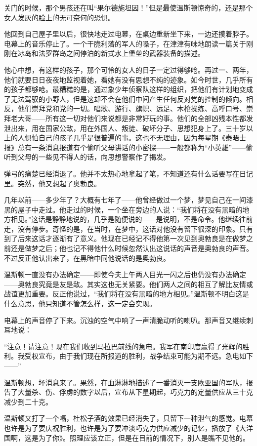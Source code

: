 关门的时候，那个男孩还在叫“果尔德施坦因！”但是最使温斯顿惊奇的，还是那个女人发灰的脸上的无可奈何的恐惧。


他回到自己屋子里以后，很快地走过电幕，在桌边重新坐下来，一边还摸着脖子。电幕上的音乐停止了。一个干脆利落的军人的嗓子，在津津有味地朗读一篇关于刚刚在冰岛和法罗群岛之间停泊的新式水上堡垒的武器装备的描述。


他心中想，有这样的孩子，那个可怜的女人的日子一定过得够呛。再过一、两年，他们就要日日夜夜地监视着她，看她有没有思想不纯的迹象。如今时世，几乎所有的孩子都够呛。最糟糕的是，通过象少年侦察队这样的组织，把他们有计划地变成了无法驾驭的小野人，但是这却不会在他们中间产生任何反对党的控制的倾向。相反，他们崇拜党和党的一切。唱歌、游行、旗帜、远足、木枪操练、高呼口号、崇拜老大哥——所有这一切对他们来说都是非常好玩的事。他们的全部凶残本性都发泄出来，用在国家公敌，用在外国人、叛徒、破坏分子、思想犯身上了。三十岁以上的人惧怕自己的孩子几乎是很普遍的事。这也不无理由，因为每星期《泰晤士报》总有一条消息报道有个偷听父母讲话的小密探——一般都称为“小英雄”——偷听到父母的一些见不得人的话，向思想警察作了揭发。


弹弓的痛楚已经消退了。他并不太热心地拿起了笔，不知道还有什么话要写在日记里。突然，他又想起了奥勃良。


几年以前——多少年了？大概有七年了——他曾经做过一个梦，梦见自己在一间漆黑的屋子中走过。他走过的时候，一个坐在旁边的人说：“我们将在没有黑暗的地方相见。”这话是静静地说的，几乎是随便说的——是说明，不是命令。他继续往前走，没有停步。奇怪的是，在当时，在梦中，这话对他没有留下很深的印象。只有到了后来这话才逐渐有了意义。他现在已经记不得他第一次见到奥勃良是在做梦之前还是做梦之后；他也记不得他什么时候忽然认出这说话的声音是奥勃良的声音。不过反正他认出来了，在黑暗中同他说话的是奥勃良。


温斯顿一直没有办法确定——即使今夫上午两人目光一闪之后也仍没有办法确定——奥勃良究竟是友是敌。其实这也无关紧要。他们两人之间的相互了解比友情或战谊更加重要。反正他说过，“我们将在没有黑暗的地方相见。”温斯顿不明白这是什么意思，他只知道不管怎么样，这一定会实现。


电幕上的声音停了下来。沉浊的空气中响了一声清脆动听的喇叭。那声音又继续刺耳地说：


“注意！请注意！现在我们收到马拉巴前线的急电。我军在南印度赢得了光辉的胜利。我受权宣布，由于我们现在所报道的胜利，战争结束可能为期不远。急电如下——”


温斯顿想，坏消息来了。果然，在血淋淋地描述了一番消灭一支欧亚国的军队，报告了大量杀、伤、俘虏的数字以后，宣布从下星期起，巧克力的定量供应从三十克减少到二十克。


温斯顿又打了一个嗝，杜松子酒的效果已经消失了，只留下一种泄气的感觉。电幕也许是为了要庆祝胜利，也许是为了要冲淡巧克力供应减少的记忆，播放了《大洋国啊，这是为了你》。照理应该立正，但是在目前的情况下，别人是瞧不见他的。


